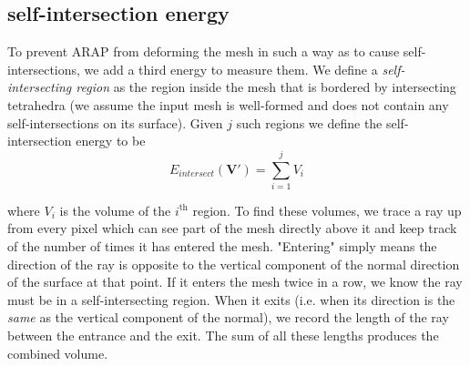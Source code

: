 \documentclass[12pt]{article}
\newcommand{\bV}{\mathbf{V}}
\begin{document}
\subsection*{self-intersection energy}

To prevent ARAP from deforming the mesh in such a way as to cause self-intersections, we add a third energy to measure them. We define a \textit{self-intersecting region} as the region inside the mesh that is bordered by intersecting tetrahedra (we assume the input mesh is well-formed and does not contain any self-intersections on its surface). Given $j$ such regions we define the self-intersection energy to be
\[
	E_{intersect}(\bV') = \sum_{i=1}^j V_i
\]

where $V_i$ is the volume of the $i^{\text{th}}$ region. To find these volumes, we trace a ray up from every pixel which can see part of the mesh directly above it and keep track of the number of times it has entered the mesh. "Entering" simply means the direction of the ray is opposite to the vertical component of the normal direction of the surface at that point. If it enters the mesh twice in a row, we know the ray must be in a self-intersecting region. When it exits (i.e. when its direction is the \textit{same} as the vertical component of the normal), we record the length of the ray between the entrance and the exit. The sum of all these lengths produces the combined volume.
\end{document}
